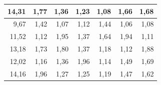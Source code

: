 \documentclass[14pt,a4paper]{scrartcl}
\begin{document}
\begin{table}[htbp]
{\begin{tabular}{|rrrrrrr|}
		\rowcolor[rgb]{ .867,  .922,  .969} 14,31 & 1,77  & 1,36  & 1,23  & 1,08  & 1,66  & 1,68 \bigstrut\\
		\hline
		9,67  & 1,42  & 1,07  & 1,12  & 1,44  & 1,06  & 1,08 \bigstrut\\
		\hline
		\rowcolor[rgb]{ .867,  .922,  .969} 11,52 & 1,12  & 1,95  & 1,37  & 1,64  & 1,94  & 1,11 \bigstrut\\
		\hline
		13,18 & 1,73  & 1,80  & 1,37  & 1,18  & 1,12  & 1,88 \bigstrut\\
		\hline
		\rowcolor[rgb]{ .867,  .922,  .969} 12,02 & 1,16  & 1,36  & 1,96  & 1,14  & 1,49  & 1,69 \bigstrut\\
		\hline
		14,16 & 1,96  & 1,27  & 1,25  & 1,19  & 1,47  & 1,62 \bigstrut\\
		\hline
	\end{tabular}}%
	\label{tab:addlabel1}%
\end{table}%
\end{document}

